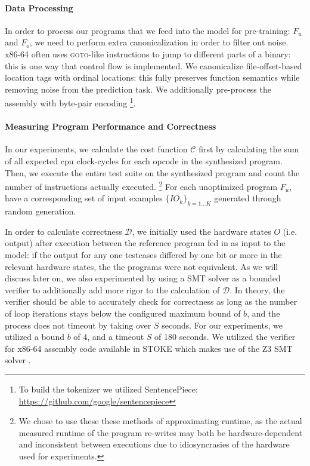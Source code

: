\documentclass{article}
\begin{document}
\paragraph{Data Processing} In order to process our programs that we feed into the model for pre-training: $F_u$ and $F_o$, we need to perform extra canonicalization in order to filter out noise. x86-64 often uses \textsc{goto}-like instructions to jump to different parts of a binary: this is one way that control flow is implemented. We canonicalize file-offset-based location tags  with ordinal locations: this fully preserves function semantics while removing noise from the prediction task. We additionally pre-process the assembly with byte-pair encoding \citep{sennrich2015neural} \footnote{To build the tokenizer we utilized SentencePiece: \url{https://github.com/google/sentencepiece}}. 


\paragraph{Measuring Program Performance and Correctness} In our experiments, we calculate the cost function $\mathcal{C}$ first by calculating the sum of all expected cpu clock-cycles for each opcode in the synthesized program. Then, we execute the entire test suite on the synthesized program and count the number of instructions actually executed.%
\footnote{We chose to use these these methods of approximating runtime, as the actual measured runtime of the program re-writes may both be hardware-dependent and inconsistent between executions due to idiosyncrasies of the hardware used for experiments.} For each unoptimized program $F_u$, have a corresponding set of input examples ${\{IO_k\}}_{k=1...K}$ generated through random generation. 


In order to calculate correctness $\mathcal{D}$, we initially used the hardware states $O$ (i.e. output) after execution between the reference program fed in as input to the model: if the output for any one testcases differed by one bit or more in the relevant hardware states, the the programs were not equivalent. As we will discuss later on, we also experimented by using a SMT solver as a bounded verifier  to additionally add more rigor to the calculation of $\mathcal{D}$. In theory, the verifier should be able to accurately check for correctness as long as the number of loop iterations stays below the configured maximum bound of $b$, and the process does not timeout by taking over $S$ seconds. For our experiments, we utilized a bound $b$ of 4, and a timeout $S$ of 180 seconds. 
We utilized the verifier for x86-64 assembly code available in \textsc{STOKE} which makes use of the Z3 SMT solver \cite{churchill2017sound, de2008z3}. 
\end{document}
